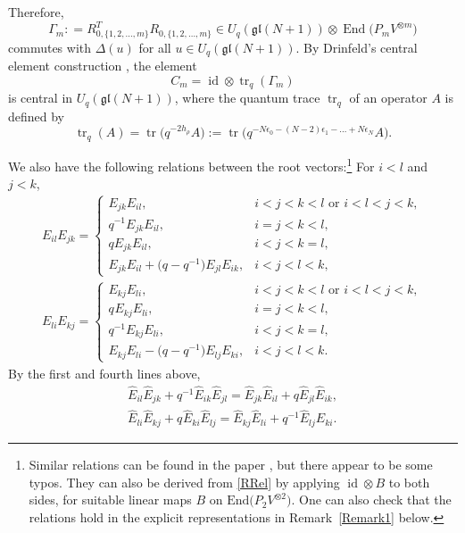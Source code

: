 \documentclass[11pt]{article}
\numberwithin{equation}{section}
\numberwithin{equation}{section}
\DeclareMathOperator{\End}{End}
\DeclareMathOperator{\tr}{tr}
\DeclareMathOperator{\id}{id}
\newcommand{\Uqgl}{{U_q(\mathfrak{gl}(N+1))}}
\begin{document}
Therefore,
\begin{equation*}
\Gamma_m: = R^T_{0,\{1,2,\dots,m\}} R_{0,\{1,2,\dots,m\}} \in \Uqgl \otimes \End \big(P_m V^{\otimes m}\big)
\end{equation*}
commutes with $ \Delta (u) $ for all $u\in \Uqgl$. By Drinfeld's central element construction \cite{Drin90}, the element
\begin{equation*}
C_m= \id \otimes\tr_q(\Gamma_m)
\end{equation*}
is central in $\Uqgl$, where the quantum trace $ \tr_q $ of an operator $A$ is defined by
\begin{equation*}%
\tr_q(A) = \tr\big(q^{-2h_{\rho}}A\big) := \tr \big(q^{-N\epsilon_0-(N-2)\epsilon_1 - \dots +N\epsilon_N}A\big).
\end{equation*}

We also have the following relations between the root vectors:\footnote{Similar relations can be found in the paper \cite{Xi1994}, but there appear to be some typos. They can also be derived from \eqref{RRel} by applying $\id \otimes B$ to both sides, for suitable linear maps $B$ on $\mathrm{End}\big(P_2V^{\otimes 2}\big)$. One can also check that the relations hold in the explicit representations in Remark~\ref{Remark1} below.}
For $i<l$ and $j<k$,
\begin{gather}\label{comm}
{E}_{il}{E}_{jk} =
\begin{cases}
{E}_{jk}{E}_{il}, & i< j < k < l \text{ or } i<l<j<k,\\
q^{-1} {E}_{jk}{E}_{il}, & i=j<k<l, \\
q {E}_{jk}{E}_{il}, & i<j<k=l,\\
{E}_{jk}{E}_{il} + \big(q-q^{-1}\big) {E}_{jl}{E}_{ik}, & i<j<l<k,
\end{cases}
\\
\label{comm1}
{E}_{li}{E}_{kj} =
\begin{cases}
{E}_{kj}{E}_{li}, & i< j < k < l \text{ or } i<l<j<k,\\
q^{} {E}_{kj}{E}_{li}, & i=j<k<l, \\
q^{-1} {E}_{kj}{E}_{li}, & i<j<k=l,\\
{E}_{kj}{E}_{li} - \big(q-q^{-1}\big) {E}_{lj}{E}_{ki}, & i<j<l<k.
\end{cases}
\end{gather}
By the first and fourth lines above,
\begin{gather}\label{comm2}
\hat{E}_{il}\hat{E}_{jk} + q^{-1} \hat{E}_{ik}\hat{E}_{jl} = \hat{E}_{jk}\hat{E}_{il} + q \hat{E}_{jl}\hat{E}_{ik}, \\
\hat{E}_{li}\hat{E}_{kj} + q^{} \hat{E}_{ki}\hat{E}_{lj} = \hat{E}_{kj}\hat{E}_{li} + q^{-1} \hat{E}_{lj}\hat{E}_{ki}. \label{comm3}
\end{gather}
\end{document}

